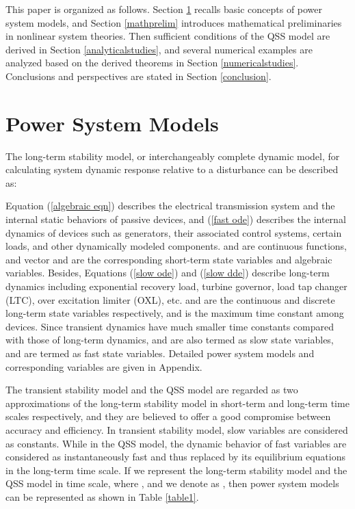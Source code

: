 \documentclass[journal]{IEEEtran}
\begin{document}
This paper is organized as follows. Section \ref{sectioncompleteqssmodel} recalls basic concepts of power system models, and Section \ref{mathprelim} introduces mathematical preliminaries in nonlinear system theories. Then sufficient conditions of the QSS model are derived in Section \ref{analyticalstudies}, and several numerical examples are analyzed based on the derived theorems in Section \ref{numericalstudies}. Conclusions and perspectives are stated in Section \ref{conclusion}.

\section{Power System Models}\label{sectioncompleteqssmodel}
The long-term stability model, or interchangeably complete dynamic model, for calculating system dynamic response relative to a disturbance can be described as:


Equation (\ref{algebraic eqn}) describes the electrical transmission system and the internal static behaviors of passive devices, and (\ref{fast ode}) describes the internal dynamics of devices such as generators, their associated control systems, certain loads, and other dynamically modeled components.  and  are continuous functions, and vector  and  are the corresponding short-term state variables and algebraic variables. Besides, Equations (\ref{slow ode}) and (\ref{slow dde}) describe long-term dynamics including exponential recovery load, turbine governor, load tap changer (LTC), over excitation limiter (OXL), etc.  and  are the continuous and discrete long-term state variables respectively, and  is the maximum time constant among devices. Since transient dynamics have much smaller time constants compared with those of long-term dynamics,  and  are also termed as slow state variables, and  are termed as fast state variables. Detailed power system models and corresponding variables are given in Appendix.

The transient stability model and the QSS model are regarded as two approximations of the long-term stability model in short-term and long-term time scales respectively, and they are believed to offer a good compromise between accuracy and efficiency. In transient stability model, slow variables are considered as constants. While in the QSS model, the dynamic behavior of fast variables are considered as instantaneously fast and thus replaced by its equilibrium equations in the long-term time scale. If we represent the long-term stability model and the QSS model in  time scale, where , and we denote  as , then power system models can be represented as shown in Table \ref{table1}.
\end{document}
